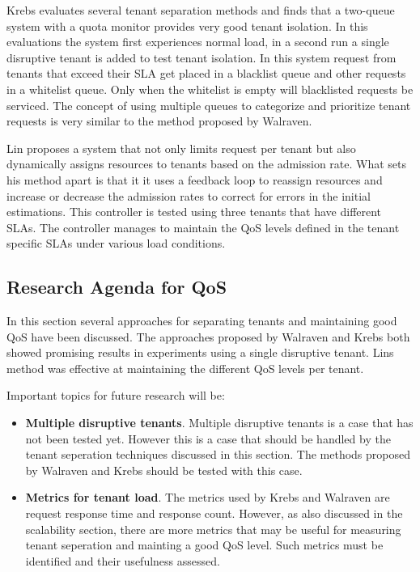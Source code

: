 Krebs evaluates several tenant separation methods and finds that a two-queue system with a quota monitor provides very good tenant isolation.
In this evaluations the system first experiences normal load, in a second run a single disruptive tenant is added to test tenant isolation.
In this system request from tenants that exceed their \ac{SLA} get placed in a blacklist queue and other requests in a whitelist queue. 
Only when the whitelist is empty will blacklisted requests be serviced.
The concept of using multiple queues to categorize and prioritize tenant requests is very similar to the method proposed by Walraven.

Lin proposes a system that not only limits request per tenant but also dynamically assigns resources to tenants based on the admission rate.
What sets his method apart is that it it uses a feedback loop to reassign resources and increase or decrease the admission rates to correct for errors in the initial estimations.
This controller is tested using three tenants that have different \acp{SLA}. 
The controller manages to maintain the \ac{QoS} levels defined in the tenant specific \acp{SLA} under various load conditions.

\subsection{Research Agenda for \ac{QoS}}
In this section several approaches for separating tenants and maintaining good \ac{QoS} have been discussed.
The approaches proposed by Walraven and Krebs both showed promising results in experiments using a single disruptive tenant.
Lins method was effective at maintaining the different \ac{QoS} levels per tenant.

Important topics for future research will be:
\begin{itemize}
	\item \textbf{Multiple disruptive tenants}.
		Multiple disruptive tenants is a case that has not been tested yet. 
		However this is a case that should be handled by the tenant seperation techniques discussed in this section.
		The methods proposed by Walraven and Krebs should be tested with this case.
	\item \textbf{Metrics for tenant load}.
		The metrics used by Krebs and Walraven are request response time and response count. 
		However, as also discussed in the scalability section, there are more metrics that may be useful for measuring tenant seperation and mainting a good \ac{QoS} level. Such metrics must be identified and their usefulness assessed.
\end{itemize}

